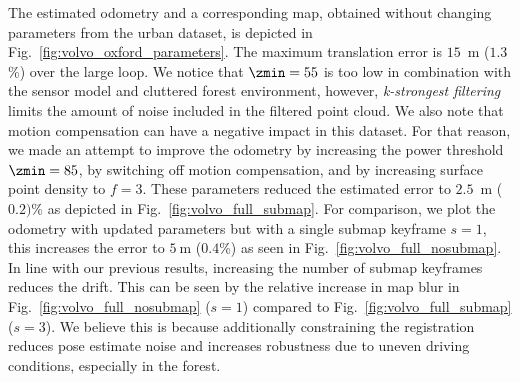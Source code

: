 The estimated odometry and a corresponding map, obtained without changing parameters from the urban dataset, is depicted in Fig.~\ref{fig:volvo_oxford_parameters}. The maximum translation error is $15$~m ($1.3$\%) over the large loop. We notice that $\zmin=55$ is too low in combination with the sensor model and cluttered forest environment, however, \textit{k-strongest filtering} limits the amount of noise included in the filtered point cloud. We also note that motion compensation can have a negative impact in this dataset. For that reason, we made an attempt to improve the odometry by increasing the power threshold $\zmin=85$, by switching off motion compensation, and by increasing surface point density to $f=3$. These parameters reduced the estimated error to $2.5$~m ($0.2)$\% as depicted in Fig.~\ref{fig:volvo_full_submap}. For comparison, we plot the odometry with updated parameters but with a single submap keyframe $s=1$, this increases the error to $5~$m ($0.4$\%) as seen in Fig.~\ref{fig:volvo_full_nosubmap}.
In line with our previous results, increasing the number of submap keyframes reduces the drift. This can be seen by the relative increase in map blur in Fig.~\ref{fig:volvo_full_nosubmap} ($s = 1$) compared to Fig.~\ref{fig:volvo_full_submap} ($s = 3$). We believe this is because additionally constraining the registration reduces pose estimate noise and increases robustness due to uneven driving conditions, especially in the forest.



